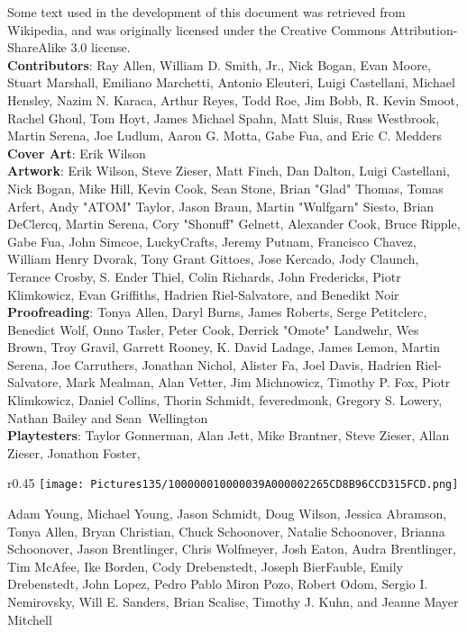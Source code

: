 \documentclass[a4paper,twoside,openany,10pt]{book}
\begin{document}
Some text used in the development of this document was retrieved from Wikipedia, and was originally licensed under the Creative Commons Attribution-ShareAlike 3.0 license.\\

\textbf{Contributors}: Ray Allen, William D. Smith, Jr., Nick Bogan, Evan Moore, Stuart Marshall, Emiliano Marchetti, Antonio Eleuteri, Luigi Castellani, Michael Hensley, Nazim N. Karaca, Arthur Reyes, Todd Roe, Jim Bobb, R. Kevin Smoot, Rachel Ghoul, Tom Hoyt, James Michael Spahn, Matt Sluis, Russ Westbrook, Martin Serena, Joe Ludlum, Aaron G. Motta, Gabe Fua, and Eric C. Medders\\

\textbf{Cover Art}: Erik Wilson\\

\textbf{Artwork}: Erik Wilson, Steve Zieser, Matt Finch, Dan Dalton, Luigi Castellani, Nick Bogan, Mike Hill, Kevin Cook, Sean Stone, Brian "Glad" Thomas, Tomas Arfert, Andy "ATOM" Taylor, Jason Braun, Martin "Wulfgarn" Siesto, Brian DeClercq, Martin Serena, Cory "Shonuff" Gelnett, Alexander Cook, Bruce Ripple, Gabe Fua, John Simcoe, LuckyCrafts, Jeremy Putnam, Francisco Chavez, William Henry Dvorak, Tony Grant Gittoes, Jose Kercado, Jody Claunch, Terance Crosby, S. Ender Thiel, Colin Richards, John Fredericks, Piotr Klimkowicz, Evan Griffiths, Hadrien Riel-Salvatore, and Benedikt Noir\\

\textbf{Proofreading}: Tonya Allen, Daryl Burns, James Roberts, Serge Petitclerc, Benedict Wolf, Onno Tasler, Peter Cook, Derrick "Omote" Landwehr, Wes Brown, Troy Gravil, Garrett Rooney, K. David Ladage, James Lemon, Martin Serena, Joe Carruthers, Jonathan Nichol, Alister Fa, Joel Davis, Hadrien Riel-Salvatore, Mark Mealman, Alan Vetter, Jim Michnowicz, Timothy P. Fox, Piotr Klimkowicz, Daniel Collins, Thorin Schmidt, feveredmonk, Gregory S. Lowery, Nathan Bailey and Sean Wellington\\

\textbf{Playtesters}: Taylor Gonnerman, Alan Jett, Mike Brantner, Steve Zieser, Allan Zieser, Jonathon Foster, 
\begin{wrapfigure}{r}{0.45\textwidth}
	\texttt{[image: Pictures135/100000010000039A000002265CD8B96CCD315FCD.png]}
\end{wrapfigure}
Adam Young, Michael Young, Jason Schmidt, Doug Wilson, Jessica Abramson, Tonya Allen, Bryan Christian, Chuck Schoonover, Natalie Schoonover, Brianna Schoonover, Jason Brentlinger, Chris Wolfmeyer, Josh Eaton, Audra Brentlinger, Tim McAfee, Ike Borden, Cody Drebenstedt, Joseph BierFauble, Emily Drebenstedt, John Lopez, Pedro Pablo Miron Pozo, Robert Odom, Sergio I. Nemirovsky, Will E. Sanders, Brian Scalise, Timothy J. Kuhn, and Jeanne Mayer Mitchell\\
\end{document}
